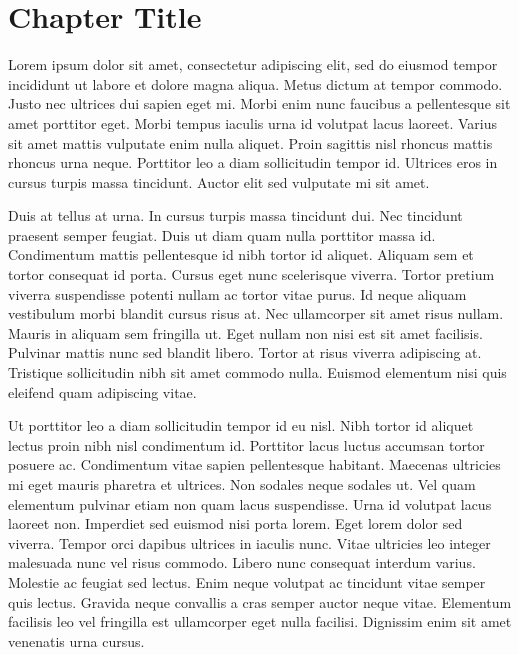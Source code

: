 \chapter{Chapter Title}
Lorem ipsum dolor sit amet, consectetur adipiscing elit, sed do eiusmod tempor incididunt ut labore et dolore magna aliqua. Metus dictum at tempor commodo. Justo nec ultrices dui sapien eget mi. Morbi enim nunc faucibus a pellentesque sit amet porttitor eget. Morbi tempus iaculis urna id volutpat lacus laoreet. Varius sit amet mattis vulputate enim nulla aliquet. Proin sagittis nisl rhoncus mattis rhoncus urna neque. Porttitor leo a diam sollicitudin tempor id. Ultrices eros in cursus turpis massa tincidunt. Auctor elit sed vulputate mi sit amet.

Duis at tellus at urna. In cursus turpis massa tincidunt dui. Nec tincidunt praesent semper feugiat. Duis ut diam quam nulla porttitor massa id. Condimentum mattis pellentesque id nibh tortor id aliquet. Aliquam sem et tortor consequat id porta. Cursus eget nunc scelerisque viverra. Tortor pretium viverra suspendisse potenti nullam ac tortor vitae purus. Id neque aliquam vestibulum morbi blandit cursus risus at. Nec ullamcorper sit amet risus nullam. Mauris in aliquam sem fringilla ut. Eget nullam non nisi est sit amet facilisis. Pulvinar mattis nunc sed blandit libero. Tortor at risus viverra adipiscing at. Tristique sollicitudin nibh sit amet commodo nulla. Euismod elementum nisi quis eleifend quam adipiscing vitae.

Ut porttitor leo a diam sollicitudin tempor id eu nisl. Nibh tortor id aliquet lectus proin nibh nisl condimentum id. Porttitor lacus luctus accumsan tortor posuere ac. Condimentum vitae sapien pellentesque habitant. Maecenas ultricies mi eget mauris pharetra et ultrices. Non sodales neque sodales ut. Vel quam elementum pulvinar etiam non quam lacus suspendisse. Urna id volutpat lacus laoreet non. Imperdiet sed euismod nisi porta lorem. Eget lorem dolor sed viverra. Tempor orci dapibus ultrices in iaculis nunc. Vitae ultricies leo integer malesuada nunc vel risus commodo. Libero nunc consequat interdum varius. Molestie ac feugiat sed lectus. Enim neque volutpat ac tincidunt vitae semper quis lectus. Gravida neque convallis a cras semper auctor neque vitae. Elementum facilisis leo vel fringilla est ullamcorper eget nulla facilisi. Dignissim enim sit amet venenatis urna cursus.

